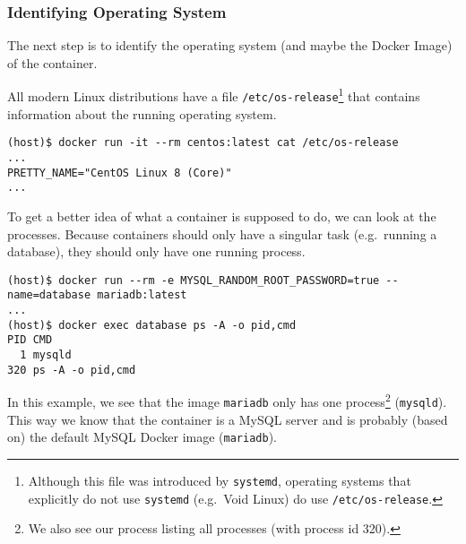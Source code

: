 \subsubsection{Identifying Operating System}

The next step is to identify the operating system (and maybe the Docker Image) of the container.

All modern Linux distributions have a file \lstinline{/etc/os-release}\footnote{Although this file was introduced by \lstinline{systemd}, operating systems that explicitly do not use \lstinline{systemd} (e.g.\ Void Linux) do use \lstinline{/etc/os-release}.} that contains information about the running operating system.
\begin{lstlisting}[caption={CentOS container \lstinline{/etc/os-release}.},captionpos=b]
(host)$ docker run -it --rm centos:latest cat /etc/os-release
...
PRETTY_NAME="CentOS Linux 8 (Core)"
...
\end{lstlisting}

To get a better idea of what a container is supposed to do, we can look at the processes. Because containers should only have a singular task (e.g.\ running a database), they should only have one running process.

\begin{lstlisting}[caption={A container only has one process.},captionpos=b]
(host)$ docker run --rm -e MYSQL_RANDOM_ROOT_PASSWORD=true --name=database mariadb:latest
...
(host)$ docker exec database ps -A -o pid,cmd
PID CMD
  1 mysqld
320 ps -A -o pid,cmd
\end{lstlisting}

In this example, we see that the image \lstinline{mariadb} only has one process\footnote{We also see our process listing all processes (with process id 320).} (\lstinline{mysqld}). This way we know that the container is a MySQL server and is probably (based on) the default MySQL Docker image (\lstinline{mariadb}).

